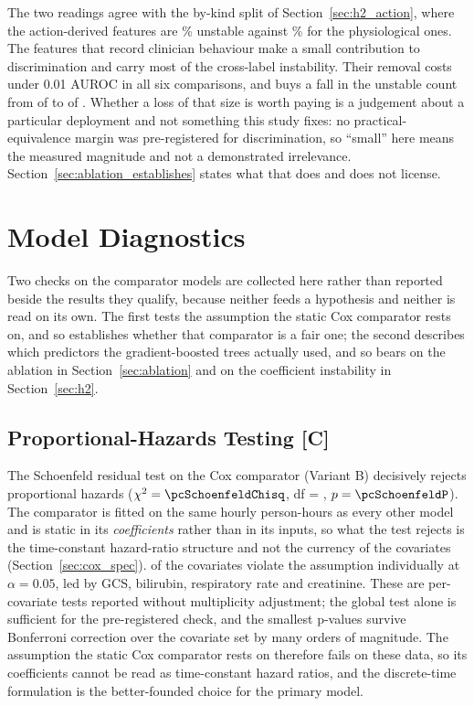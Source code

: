 The two readings agree with the by-kind split of
Section~\ref{sec:h2_action}, where the action-derived features are
\pcHTwoPctUnstableAction\% unstable against \pcHTwoPctUnstablePhysio\% for the
physiological ones.
The features that record clinician behaviour make a small contribution to
discrimination and carry most of the cross-label instability. Their removal
costs under 0.01 AUROC in all six comparisons, and buys a fall in the unstable
count from \pcHTwoEst{} of \pcHTwoNTerms{} to \pcAblHTwoNUnstable{} of
\pcAblHTwoNTerms. Whether a loss of that size is worth paying is a judgement
about a particular deployment and not something this study fixes: no
practical-equivalence margin was pre-registered for discrimination, so
``small'' here means the measured magnitude and not a demonstrated
irrelevance. Section~\ref{sec:ablation_establishes} states what that does and does not
license.



\section{Model Diagnostics}
\label{sec:model_diagnostics}

Two checks on the comparator models are collected here rather than reported
beside the results they qualify, because neither feeds a hypothesis and neither
is read on its own. The first tests the assumption the static Cox comparator
rests on, and so establishes whether that comparator is a fair one; the second
describes which predictors the gradient-boosted trees actually used, and so
bears on the ablation in Section~\ref{sec:ablation} and on the coefficient
instability in Section~\ref{sec:h2}.

\subsection{Proportional-Hazards Testing \texorpdfstring{[C]}{[C]}}
\label{sec:schoenfeld}

The Schoenfeld residual test on the Cox comparator (Variant B) decisively
rejects proportional hazards ($\chi^2 = \pcSchoenfeldChisq$,
df = \pcSchoenfeldDf, $p = \pcSchoenfeldP$). The comparator is fitted on the
same hourly person-hours as every other model and is static in its
\emph{coefficients} rather than in its inputs, so what the test rejects is the
time-constant hazard-ratio structure and not the currency of the covariates
(Section~\ref{sec:cox_spec}).
\pcSchoenfeldNViolate{} of the \pcSchoenfeldNCovariates{} covariates violate
the assumption individually at $\alpha = 0.05$, led by GCS, bilirubin,
respiratory rate and creatinine. These are per-covariate tests reported without
multiplicity adjustment; the global test alone is sufficient for the
pre-registered check, and the smallest p-values survive Bonferroni correction
over the covariate set by many orders of magnitude. The assumption the static
Cox comparator rests on therefore fails on these data, so its coefficients
cannot be read as time-constant hazard ratios, and the discrete-time
formulation is the better-founded choice for the primary model.

